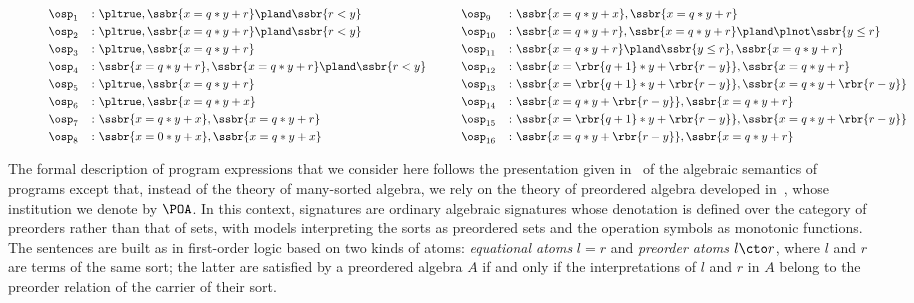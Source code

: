 \documentclass{LMCS}
\begin{document}
\begin{sidewaysfigure}
  \begin{alignat*}{4}
    & \osp_{1}  && {} \colon \pltrue, \ssbr{x = q * y + r} \pland \ssbr{r < y} & \qquad
    & \osp_{9}  && {} \colon \ssbr{x = q * y + x}, \ssbr{x = q * y + r}
    \\
    & \osp_{2}  && {} \colon \pltrue, \ssbr{x = q * y + r} \pland \ssbr{r < y} &
    & \osp_{10} && {} \colon \ssbr{x = q * y + r}, \ssbr{x = q * y + r} \pland \plnot \ssbr{y \leq r}
    \\
    & \osp_{3}  && {}  \colon \pltrue, \ssbr{x = q * y + r} &
    & \osp_{11} && {} \colon \ssbr{x = q * y + r} \pland \ssbr{y \leq r}, \ssbr{x = q * y + r}
    \\
    & \osp_{4}  && {} \colon \ssbr{x = q * y + r}, \ssbr{x = q * y + r} \pland \ssbr{r < y} &
    & \osp_{12} && {} \colon \ssbr{x = \rbr{q + 1} * y + \rbr{r - y}}, \ssbr{x = q * y + r}
    \\
    & \osp_{5}  && {} \colon \pltrue, \ssbr{x = q * y + r} &
    & \osp_{13} && {} \colon \ssbr{x = \rbr{q + 1} * y + \rbr{r - y}}, \ssbr{x = q * y + \rbr{r - y}}
    \\
    & \osp_{6}  && {} \colon \pltrue, \ssbr{x = q * y + x} &
    & \osp_{14} && {} \colon \ssbr{x = q * y + \rbr{r - y}}, \ssbr{x = q * y + r}
    \\
    & \osp_{7}  && {} \colon \ssbr{x = q * y + x}, \ssbr{x = q * y + r} &
    & \osp_{15} && {} \colon \ssbr{x = \rbr{q + 1} * y + \rbr{r - y}}, \ssbr{x = q * y + \rbr{r - y}}
    \\
    & \osp_{8}  && {} \colon \ssbr{x = 0 * y + x}, \ssbr{x = q * y + x} &
    & \osp_{16} && {} \colon \ssbr{x = q * y + \rbr{r - y}}, \ssbr{x = q * y + r}
  \end{alignat*}
\end{sidewaysfigure}

The formal description of program expressions that we consider here follows the presentation given in~\cite{Goguen-Malcolm:Algebraic-Semantics-of-Imperative-Programs-1996} of the algebraic semantics of programs except that, instead of the theory of many-sorted algebra, we rely on the theory of preordered algebra developed in~\cite{Diaconescu-Futatsugi:CafeOBJ-Report-1998}, whose institution we denote by \(\POA\).
In this context, signatures are ordinary algebraic signatures whose denotation is defined over the category of preorders rather than that of sets, with models interpreting the sorts as preordered sets and the operation symbols as monotonic functions.  The sentences are built as in first-order logic based on two kinds of atoms: \emph{equational atoms} \(l = r\) and \emph{preorder atoms} \(l \cto r\), where \(l\) and \(r\) are terms of the same sort; the latter are satisfied by a preordered algebra \(A\) if and only if the interpretations of \(l\) and \(r\) in \(A\) belong to the preorder relation of the carrier of their sort.
\end{document}
